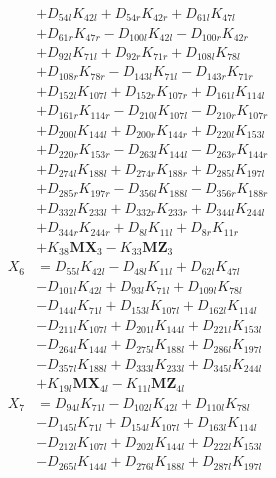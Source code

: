 \begin{multicols}{2}
\begin{align}
&+ D_{54l}K_{42l} + D_{54r}K_{42r} + D_{61l}K_{47l}  \nonumber \\
&+ D_{61r}K_{47r} - D_{100l}K_{42l} - D_{100r}K_{42r}  \nonumber \\
&+ D_{92l}K_{71l} + D_{92r}K_{71r} + D_{108l}K_{78l}  \nonumber \\
&+ D_{108r}K_{78r} - D_{143l}K_{71l} - D_{143r}K_{71r}  \nonumber \\
&+ D_{152l}K_{107l} + D_{152r}K_{107r} + D_{161l}K_{114l}  \nonumber \\
&+ D_{161r}K_{114r} - D_{210l}K_{107l} - D_{210r}K_{107r}  \nonumber \\
&+ D_{200l}K_{144l} + D_{200r}K_{144r} + D_{220l}K_{153l}  \nonumber \\
&+ D_{220r}K_{153r} - D_{263l}K_{144l} - D_{263r}K_{144r}  \nonumber \\
&+ D_{274l}K_{188l} + D_{274r}K_{188r} + D_{285l}K_{197l}  \nonumber \\
&+ D_{285r}K_{197r} - D_{356l}K_{188l} - D_{356r}K_{188r}  \nonumber \\
&+ D_{332l}K_{233l} + D_{332r}K_{233r} + D_{344l}K_{244l}  \nonumber \\
&+ D_{344r}K_{244r} + D_{8l}K_{11l} + D_{8r}K_{11r}  \nonumber \\
&+ K_{38}\mathbf{MX}_3 - K_{33}\mathbf{MZ}_3 \nonumber \\
X_{6} &= D_{55l}K_{42l} - D_{48l}K_{11l} + D_{62l}K_{47l}  \nonumber \\
&- D_{101l}K_{42l} + D_{93l}K_{71l} + D_{109l}K_{78l}  \nonumber \\
&- D_{144l}K_{71l} + D_{153l}K_{107l} + D_{162l}K_{114l}  \nonumber \\
&- D_{211l}K_{107l} + D_{201l}K_{144l} + D_{221l}K_{153l}  \nonumber \\
&- D_{264l}K_{144l} + D_{275l}K_{188l} + D_{286l}K_{197l}  \nonumber \\
&- D_{357l}K_{188l} + D_{333l}K_{233l} + D_{345l}K_{244l}  \nonumber \\
&+ K_{19l}\mathbf{MX}_{4l} - K_{11l}\mathbf{MZ}_{4l} \nonumber \\
X_{7} &= D_{94l}K_{71l} - D_{102l}K_{42l} + D_{110l}K_{78l}  \nonumber \\
&- D_{145l}K_{71l} + D_{154l}K_{107l} + D_{163l}K_{114l}  \nonumber \\
&- D_{212l}K_{107l} + D_{202l}K_{144l} + D_{222l}K_{153l}  \nonumber \\
&- D_{265l}K_{144l} + D_{276l}K_{188l} + D_{287l}K_{197l}  \nonumber \\

\end{align}
\end{multicols}
